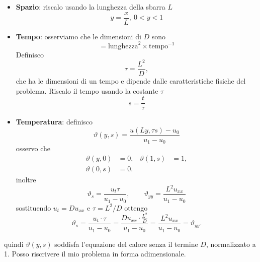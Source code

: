 \begin{itemize}
    \item \textbf{Spazio}: riscalo usando la lunghezza della sbarra $L$
          \begin{equation*}
              y=\frac{x}{L},\ 0< y< 1
          \end{equation*}
    \item \textbf{Tempo}: osserviamo che le dimensioni di $D$ sono
          \begin{equation*}
              [D] =\text{lunghezza}^{2} \times \text{tempo}^{-1}
          \end{equation*}
          Definisco
          \begin{equation*}
              \tau =\frac{L^{2}}{D},
          \end{equation*}
          che ha le dimensioni di un tempo e dipende dalle caratteristiche fisiche del problema. Riscalo il tempo usando la costante $\tau$
          \begin{equation*}
              s=\frac{t}{\tau}
          \end{equation*}
    \item \textbf{Temperatura}: definisco
          \begin{equation*}
              \vartheta (y,s) =\frac{u(Ly,\tau s) -u_{0}}{u_{1} -u_{0}}
          \end{equation*}
          osservo che
          \begin{align*}
              \vartheta (y,0) & =0, & \vartheta (1,s) & =1, \\
              \vartheta (0,s) & =0. &                 &
          \end{align*}
          inoltre
          \begin{equation*}
              \vartheta _{s} =\frac{u_{t} \tau }{u_{1} -u_{0}} ,\qquad \vartheta _{yy} =\frac{L^{2} u_{xx}}{u_{1} -u_{0}}
          \end{equation*}
          sostituendo $u_{t} =Du_{xx}$ e $\tau =L^{2} /D$ ottengo
          \begin{equation*}
              \vartheta _{s} =\frac{u_{t} \cdotp \tau }{u_{1} -u_{0}} =\frac{Du_{xx} \cdotp \frac{L^{2}}{D}}{u_{1} -u_{0}} =\frac{L^{2} u_{xx}}{u_{1} -u_{0}} =\vartheta _{yy} .
          \end{equation*}
\end{itemize}
quindi $\vartheta(y,s)$ soddisfa l'equazione del calore senza il termine $D$, normalizzato a 1. Posso riscrivere il mio problema in forma adimensionale.

